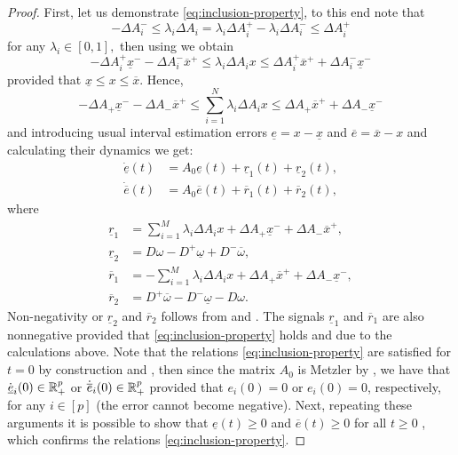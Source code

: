 \begin{proof}
	First, let us demonstrate \eqref{eq:inclusion-property}, to this end note that
	\[
	-\Delta A_{i}^{-}\leq\lambda_{i}\Delta A_{i}=\lambda_{i}\Delta A_{i}^{+}-\lambda_{i}\Delta A_{i}^{-}\leq\Delta A_{i}^{+}
	\]
	for any $\lambda_{i}\in[0,1],$ then using  we obtain
	\[
	-\Delta A_{i}^{+}\underline{x}^{-}-\Delta A_{i}^{-}\overline{x}^{+}\leq\lambda_{i}\Delta A_{i}x\leq\Delta A_{i}^{+}\overline{x}^{+}+\Delta A_{i}^{-}\underline{x}^{-}
	\]
	provided that $\underline{x}\leq x\leq\overline{x}$. Hence,
	\[
	-\Delta A_{+}\underline{x}^{-}-\Delta A_{-}\overline{x}^{+}\leq\sum_{i=1}^{N}\lambda_{i}\Delta A_{i}x\leq\Delta A_{+}\overline{x}^{+}+\Delta A_{-}\underline{x}^{-}
	\]
	and introducing usual interval estimation errors $\underline{e}=x-\underline{x}$ and $\overline{e}=\overline{x}-x$ and calculating their dynamics we get:
	\begin{align*}
		\dot{\underline{e}}(t) & = A_{0}\underline{e}(t)+\underline{r}_{1}(t)+\underline{r}_{2}(t),\\
		\dot{\overline{e}}(t) & = A_{0}\overline{e}(t)+\overline{r}_{1}(t)+\overline{r}_{2}(t),
	\end{align*}
	where
	\begin{align*}
	\underline{r}_{1}&=\sum_{i=1}^{M}\lambda_{i}\Delta A_{i}x+\Delta A_{+}\underline{x}^{-}+\Delta A_{-}\overline{x}^{+},\\
	\underline{r}_{2}&=D\omega-D^{+}\underline{\omega}+D^{-}\overline{\omega},\\
	\overline{r}_{1}&=-\sum_{i=1}^{M}\lambda_{i}\Delta A_{i}x+\Delta A_{+}\overline{x}^{+}+\Delta A_{-}\underline{x}^{-},\\
	\overline{r}_{2}&=D^{+}\overline{\omega}-D^{-}\underline{\omega}-D\omega.
	\end{align*}
	Non-negativity or $\underline{r}_{2}$ and $\overline{r}_{2}$ follows from  and . The signals $\underline{r}_{1}$ and $\overline{r}_{1}$ are also nonnegative provided that \eqref{eq:inclusion-property} holds and due to the calculations above. Note that the relations \eqref{eq:inclusion-property} are satisfied for $t=0$ by construction and , then since the matrix $A_{0}$ is Metzler by , we have that $\dot{\underline{e}}_{i}(0)\in\mathbb{R}_{+}^{p}$ or $\dot{\overline{e}}_{i}(0)\in\mathbb{R}_{+}^{p}$ provided that $e_{i}(0)=0$ or $e_{i}(0)=0$, respectively, for any $i\in[p]$ (the error cannot become negative). Next, repeating these arguments it is possible to show that $\underline{e}(t)\geq0$ and $\overline{e}(t)\geq0$ for all $t\geq0$ \citep{Smith95}, which confirms the relations \eqref{eq:inclusion-property}.
	

\end{proof}
